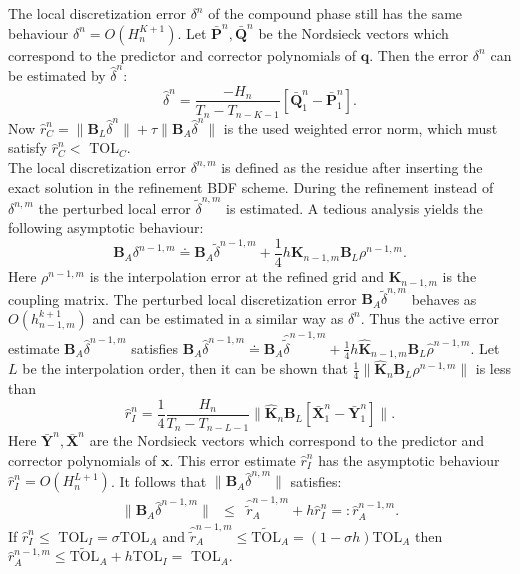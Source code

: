 \documentclass[twosided]{report}
\begin{document}
The local
discretization error $\delta^n$ of the compound phase still
has the same behaviour $\delta^n = O(H_n^{K+1})$. Let
$\bar{\mathbf{P}}^n,\bar{\mathbf{Q}}^n$ be the Nordsieck
vectors which correspond to the predictor and corrector
polynomials of $\mathbf{q}$. Then the error $\delta^n$ can
be estimated by $\hat{\delta}^n$:
$$
\hat{\delta}^n = \frac{-H_n}{T_n - T_{n-K-1}} \left
[\bar{\mathbf{Q}}_{1}^{n}-\bar{\mathbf{P}}_{1}^{n} \right ].
$$
Now $\hat r_C^n = \|\mathbf{B}_L
\hat{\delta}^n\| + \tau\|\mathbf{B}_A \hat{\delta}^n\| $ is
the used weighted error norm, which must satisfy $\hat r_C^n
<$ TOL$_C$.\\ The local discretization error $\delta^{n,m}$
is defined as the residue after inserting the exact solution
in the refinement BDF scheme. During the refinement instead
of $\delta^{n,m}$ the perturbed local error
$\tilde{\delta}^{n,m}$ is estimated. A tedious analysis
yields the following asymptotic behaviour:
$$
\mathbf{B}_A\delta^{n-1,m} \doteq
\mathbf{B}_A\tilde{\delta}^{n-1,m} + \frac{1}{4}h
\mathbf{K}_{n-1,m}\mathbf{B}_L\rho^{n-1,m}.
$$
Here $\rho^{n-1,m}$ is the interpolation error at the 
refined grid and $\mathbf{K}_{n-1,m}$ is the coupling
matrix. The perturbed local discretization error
$\mathbf{B}_A\tilde{\delta}^{n,m}$ behaves as
$O(h_{n-1,m}^{k+1})$ and can be estimated in a similar way
as $\delta^n$. Thus the active error estimate
$\mathbf{B}_A\hat\delta^{n-1,m}$ satisfies
$\mathbf{B}_A\hat\delta^{n-1,m} \doteq 
\mathbf{B}_A\hat{\tilde{\delta}}^{n-1,m} + \frac{1}{4}h
\hat{\mathbf{K}}_{n-1,m}\mathbf{B}_L\hat\rho^{n-1,m}$. Let
$L$ be the interpolation order, then it can be shown that
$\frac{1}{4}\|\hat{\mathbf{K}}_{n}\mathbf{B}_L\rho^{n-1,m}\|$
is less than
$$
\hat{r}_I^{n} =
\frac{1}{4}\frac{H_n}{T_n - T_{n-L-1}}
\|\hat{\mathbf{K}}_{n}\mathbf{B}_L
\left[\bar{\mathbf{X}}_{1}^n
-\bar{\mathbf{Y}}_{1}^n\right] \|.
$$
Here
$\bar{\mathbf{Y}}^n,\bar{\mathbf{X}}^n$ are the Nordsieck
vectors which correspond to the predictor and corrector
polynomials of $\mathbf{x}$. This error estimate
$\hat{r}_I^n$ has the asymptotic behaviour $\hat{r}_I^{n} =
O(H_n^{L+1})$. It follows that
$\|\mathbf{B}_A\hat{\delta}^{n,m}\|$ satisfies:
$$
\begin{array}{rcl}
\|\mathbf{B}_A\hat{\delta}^{n-1,m}\| &\leq&
\hat{\tilde{r}}_A^{n-1,m} + h\hat{r}_I^{n} =:
\hat{r}_A^{n-1,m}. \end{array}
$$
If $\hat{r}_I^{n} \leq $ TOL$_I = \sigma$TOL$_A$ and
$\hat{\tilde{r}}_A^{n-1,m} \leq \tilde{\mbox{TOL}}_A =
(1-\sigma h)$TOL$_A$ then $\hat{r}_A^{n-1,m} \leq
\tilde{\mbox{TOL}}_A + h$TOL$_I =$ TOL$_A$.
\end{document}
